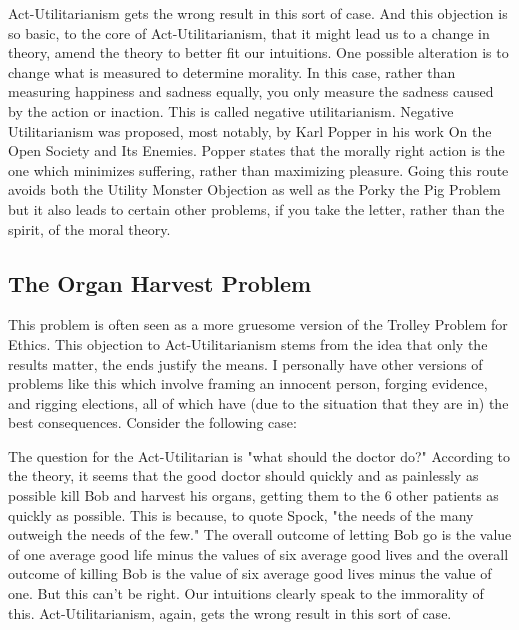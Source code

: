 Act-Utilitarianism gets the wrong result in this sort of case. And this objection is so basic, to the core of Act-Utilitarianism, that it might lead us to a change in theory, amend the theory to better fit our intuitions. One possible alteration is to change what is measured to determine morality. In this case, rather than measuring happiness and sadness equally, you only measure the sadness caused by the action or inaction. This is called negative utilitarianism. Negative Utilitarianism was proposed, most notably, by Karl Popper in his work On the Open Society and Its Enemies. Popper states that the morally right action is the one which minimizes suffering, rather than maximizing pleasure. Going this route avoids both the Utility Monster Objection as well as the Porky the Pig Problem but it also leads to certain other problems, if you take the letter, rather than the spirit, of the moral theory. 
\subsection{The Organ Harvest Problem}

This problem is often seen as a more gruesome version of the Trolley Problem for Ethics. This objection to Act-Utilitarianism stems from the idea that only the results matter, the ends justify the means. I personally have other versions of problems like this which involve framing an innocent person, forging evidence, and rigging elections, all of which have (due to the situation that they are in) the best consequences. Consider the following case:


The question for the Act-Utilitarian is "what should the doctor do?" According to the theory, it seems that the good doctor should quickly and as painlessly as possible kill Bob and harvest his organs, getting them to the 6 other patients as quickly as possible. This is because, to quote Spock, "the needs of the many outweigh the needs of the few." The overall outcome of letting Bob go is the value of one average good life minus the values of six average good lives and the overall outcome of killing Bob is the value of six average good lives minus the value of one. But this can't be right. Our intuitions clearly speak to the immorality of this.  Act-Utilitarianism, again, gets the wrong result in this sort of case. 

